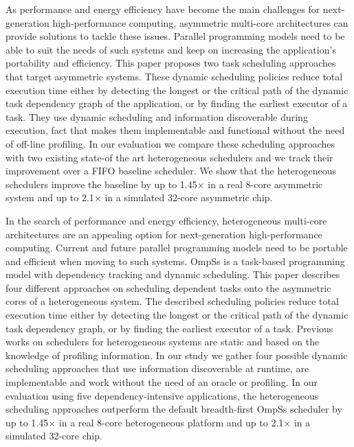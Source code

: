 As performance and energy efficiency have become the main challenges for next-generation high-performance computing, asymmetric multi-core architectures can provide solutions to tackle these issues.
Parallel programming models need to be able to suit the needs of such systems and keep on increasing the application's portability and efficiency.
This paper proposes two task scheduling approaches that target asymmetric systems.
These dynamic scheduling policies reduce total execution time either by detecting the longest or the critical path of the dynamic task dependency graph of the application, or by finding the earliest executor of a task.
They use dynamic scheduling and information discoverable during execution, fact that makes them implementable and functional without the need of off-line profiling.
In our evaluation we compare these scheduling approaches with two existing state-of the art heterogeneous schedulers and we track their improvement over a FIFO baseline scheduler.
We show that the heterogeneous schedulers improve the baseline by up to 1.45$\times$ in a real 8-core asymmetric system and up to 2.1$\times$ in a simulated 32-core asymmetric chip.

\if
In the search of performance and energy efficiency, heterogeneous multi-core architectures are an appealing option for next-generation high-performance computing. 
Current and future parallel programming models need to be portable and efficient when moving to such systems. OmpSs is a task-based programming model with dependency tracking and dynamic scheduling. This paper describes four different approaches on scheduling dependent tasks onto the asymmetric cores of a heterogeneous system. The described scheduling policies reduce total execution time either by detecting the longest or the critical path of the dynamic task dependency graph, or by finding the earliest executor of a task.
Previous works on schedulers for heterogeneous systems are static and based on the knowledge of profiling information. In our study we gather four possible dynamic scheduling approaches that use information discoverable at runtime, are implementable and work without the need of an oracle or profiling.
In our evaluation using five dependency-intensive applications, the heterogeneous scheduling approaches outperform the default breadth-first OmpSs scheduler by up to 1.45$\times$ in a real 8-core heterogeneous platform and up to 2.1$\times$ in a simulated 32-core chip.
\fi